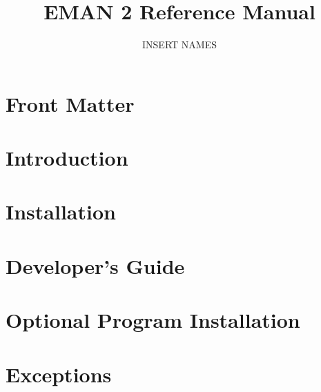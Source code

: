 \documentclass{manual}
\title{EMAN 2 Reference Manual}
\author{INSERT NAMES}
\date{}
\begin{document}
\maketitle

\ifhtml
\chapter*{Front Matter\label{front}}
\fi

%
\setcounter{tocdepth}{2}
\tableofcontents

\chapter{Introduction} 




\chapter{Installation} \label{INSTALL} 


%

\chapter{Developer's Guide} 
  \label{DEVELOPERS-GUIDE} 

 
 
 

 \label{MISC-DEVELOPERS-GUIDE}

%


\appendix

\chapter{Optional Program Installation} 


\chapter{Exceptions}



\printindex
\end{document}
